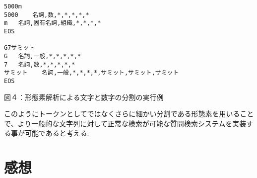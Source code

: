 \documentclass[a4j]{jarticle}
\begin{document}
\begin{screen}
\begin{verbatim}
5000m
5000	名詞,数,*,*,*,*,*
m	名詞,固有名詞,組織,*,*,*,*
EOS

G7サミット
G	名詞,一般,*,*,*,*,*
7	名詞,数,*,*,*,*,*
サミット	名詞,一般,*,*,*,*,サミット,サミット,サミット
EOS
\end{verbatim}
\end{screen}
\begin{center}
図４：形態素解析による文字と数字の分割の実行例
\end{center}
このようにトークンとしてではなくさらに細かい分割である形態素を用いることで、より一般的な文字列に対して正常な検索が可能な質問検索システムを実装する事が可能であると考える.
\section{感想}
\end{document}

